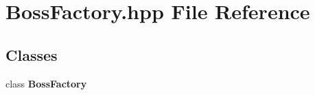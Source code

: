 \section{Boss\-Factory.\-hpp File Reference}
\label{_boss_factory_8hpp}
\subsection*{Classes}
\begin{DoxyCompactItemize}
\item 
class {\bf Boss\-Factory}
\end{DoxyCompactItemize}
